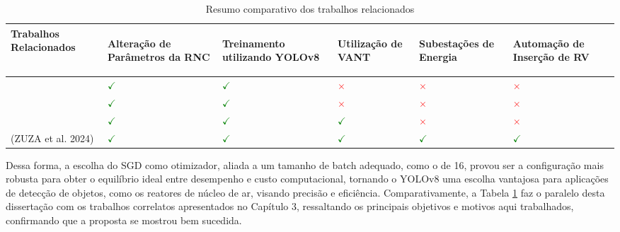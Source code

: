 \begin{table}[!hbt]
    \centering
    \caption{Resumo comparativo dos trabalhos relacionados}
    \begin{tabular}{ >{\centering\arraybackslash}m{5cm} | >{\centering\arraybackslash}m{2cm} | >{\centering\arraybackslash}m{2cm} | >{\centering\arraybackslash}m{2cm} | >{\centering\arraybackslash}m{2cm} | >{\centering\arraybackslash}m{2cm} }
    \hline
    \cellcolor[gray]{0.9} \textbf{Trabalhos Relacionados} & 
    \cellcolor[gray]{0.9} \begin{sideways} \textbf{Alteração de Parâmetros da RNC} \end{sideways} & 
    \cellcolor[gray]{0.9} \begin{sideways} \textbf{Treinamento utilizando YOLOv8} \end{sideways} & 
    \cellcolor[gray]{0.9} \begin{sideways} \textbf{Utilização de VANT} \end{sideways} & 
    \cellcolor[gray]{0.9} \begin{sideways} \textbf{Subestações de Energia} \end{sideways} &
    \cellcolor[gray]{0.9} \begin{sideways} \textbf{Automação de Inserção de RV} \end{sideways} \\
    \hline 
    \cite{gonzaga2023identificaccao} & \textcolor{green}{\(\checkmark\)} & \textcolor{green}{\(\checkmark\)} & \textcolor{red}{\(\times\)} & \textcolor{red}{\(\times\)} & \textcolor{red}{\(\times\)} \\
    \hline
    \cite{diascomparaccao} & \textcolor{green}{\(\checkmark\)} & \textcolor{green}{\(\checkmark\)} & \textcolor{red}{\(\times\)} & \textcolor{red}{\(\times\)} & \textcolor{red}{\(\times\)} \\
    \hline
    \cite{wang2023uav} & \textcolor{green}{\(\checkmark\)} & \textcolor{green}{\(\checkmark\)} & \textcolor{green}{\(\checkmark\)} & \textcolor{red}{\(\times\)} & \textcolor{red}{\(\times\)} \\
    \hline
    (ZUZA et al. 2024) & \textcolor{green}{\(\checkmark\)} & \textcolor{green}{\(\checkmark\)} & \textcolor{green}{\(\checkmark\)} & \textcolor{green}{\(\checkmark\)} & \textcolor{green}{\(\checkmark\)} \\
    \end{tabular}
    \label{tab:relacionadoZuza}
\end{table}

Dessa forma, a escolha do SGD como otimizador, aliada a um tamanho de batch adequado, como o de 16, provou ser a configuração mais robusta para obter o equilíbrio ideal entre desempenho e custo computacional, tornando o YOLOv8 uma escolha vantajosa para aplicações de detecção de objetos, como os reatores de núcleo de ar, visando precisão e eficiência. Comparativamente, a Tabela \ref{tab:relacionadoZuza} faz o paralelo desta dissertação com os trabalhos correlatos apresentados no Capítulo 3, ressaltando os principais objetivos e motivos aqui trabalhados, confirmando que a proposta se mostrou bem sucedida.


